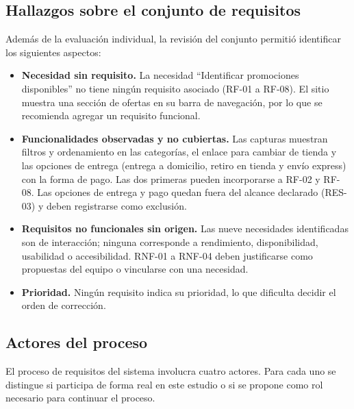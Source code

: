 \documentclass[11pt,a4paper]{article}
\begin{document}
\subsection{Hallazgos sobre el conjunto de requisitos}

Además de la evaluación individual, la revisión del conjunto
permitió identificar los siguientes aspectos:

\begin{itemize}
    \item \textbf{Necesidad sin requisito.} La necesidad
    ``Identificar promociones disponibles'' no tiene ningún
    requisito asociado (RF-01 a RF-08). El sitio muestra una
    sección de ofertas en su barra de navegación, por lo que
    se recomienda agregar un requisito funcional.
    \item \textbf{Funcionalidades observadas y no cubiertas.}
    Las capturas muestran filtros y ordenamiento en las categorías,
    el enlace para cambiar de tienda y las opciones de entrega
    (entrega a domicilio, retiro en tienda y envío express) con la
    forma de pago. Las dos primeras pueden incorporarse a RF-02 y
    RF-08. Las opciones de entrega y pago quedan fuera del alcance
    declarado (RES-03) y deben registrarse como exclusión.
    \item \textbf{Requisitos no funcionales sin origen.} Las nueve
    necesidades identificadas son de interacción; ninguna
    corresponde a rendimiento, disponibilidad, usabilidad o
    accesibilidad. RNF-01 a RNF-04 deben justificarse como
    propuestas del equipo o vincularse con una necesidad.
    \item \textbf{Prioridad.} Ningún requisito indica su
    prioridad, lo que dificulta decidir el orden de corrección.
\end{itemize}

\subsection{Actores del proceso}

El proceso de requisitos del sistema involucra cuatro actores.
Para cada uno se distingue si participa de forma real en este
estudio o si se propone como rol necesario para continuar el
proceso.

\begingroup
\footnotesize
\setlength{\tabcolsep}{2.5pt}
\renewcommand{\arraystretch}{1.15}
\end{document}
